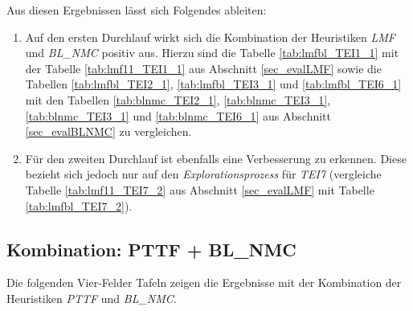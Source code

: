 \begin{multicols}{2}
\columnbreak
{}
\end{multicols}

\begin{multicols}{2}
\columnbreak
{}
\end{multicols}

\begin{multicols}{2}
\columnbreak
{}
\end{multicols}
\pagebreak
\noindent
Aus diesen Ergebnissen lässt sich Folgendes ableiten:
\begin{enumerate}
\item Auf den ersten Durchlauf wirkt sich die Kombination der \Gls{Heuristik}en \emph{LMF} und \emph{BL\_NMC} positiv aus. Hierzu sind die Tabelle \ref{tab:lmfbl_TEI1_1} mit der Tabelle \ref{tab:lmf11_TEI1_1} aus Abschnitt \ref{sec_evalLMF} sowie die Tabellen \ref{tab:lmfbl_TEI2_1}, \ref{tab:lmfbl_TEI3_1} und \ref{tab:lmfbl_TEI6_1} mit den Tabellen \ref{tab:blnmc_TEI2_1}, \ref{tab:blnmc_TEI3_1}, \ref{tab:blnmc_TEI3_1} und \ref{tab:blnmc_TEI6_1} aus Abschnitt \ref{sec_evalBLNMC} zu vergleichen.

\item Für den zweiten Durchlauf ist ebenfalls eine Verbesserung zu erkennen. Diese bezieht sich jedoch nur auf den \emph{Explorationsprozess} für \emph{TEI7} (vergleiche Tabelle \ref{tab:lmf11_TEI7_2} aus Abschnitt \ref{sec_evalLMF} mit Tabelle \ref{tab:lmfbl_TEI7_2}).
\end{enumerate}

\subsection{Kombination: PTTF + BL\_NMC}\label{sec_evalPTTFBLNMC}
Die folgenden Vier-Felder Tafeln zeigen die Ergebnisse mit der Kombination der \Gls{Heuristik}en \emph{PTTF} und \emph{BL\_NMC}.
\begin{multicols}{3}
\columnbreak
{}\columnbreak
{}
\end{multicols}

